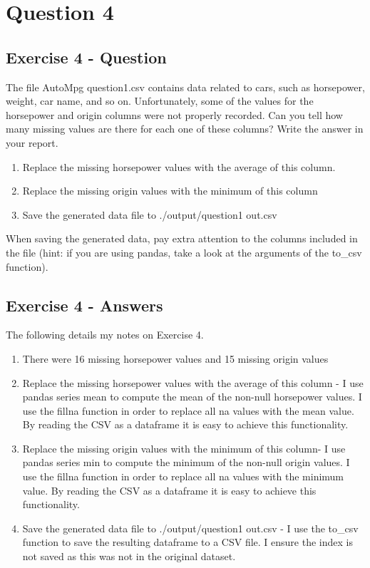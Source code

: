 \documentclass{scrreprt}
\begin{document}
	
\newpage
\chapter{Question 4}
\section{Exercise 4 - Question}
The file AutoMpg question1.csv contains data related to cars, such as horsepower, weight, car name, and so on. Unfortunately, some of the values for the horsepower and origin columns were not properly recorded. Can you tell how many missing values are there for each one of these columns? Write the answer in your report.

\begin{enumerate}
\item Replace the missing horsepower values with the average of this column.
\item Replace the missing origin values with the minimum of this column
\item Save the generated data file to ./output/question1 out.csv
\end{enumerate}

When saving the generated data, pay extra attention to the columns included in the file (hint: if you are using pandas, take a look at the arguments of the to\_csv function).


\section{Exercise 4 - Answers}
The following details my notes on Exercise 4.
	\begin{enumerate}
		
		\item There were 16 missing horsepower values and 15 missing origin values
		\item Replace the missing horsepower values with the average of this column - I use pandas series mean to compute the mean of the non-null horsepower values. I use the fillna function in order to replace all na values with the mean value. By reading the CSV as a dataframe it is easy to achieve this functionality.
		\item Replace the missing origin values with the minimum of this column- I use pandas series min to compute the minimum of the non-null origin values. I use the fillna function in order to replace all na values with the minimum value. By reading the CSV as a dataframe it is easy to achieve this functionality.
		\item Save the generated data file to ./output/question1 out.csv - I use the to\_csv function to save the resulting dataframe to a CSV file. I ensure the index is not saved as this was not in the original dataset.
	\end{enumerate}
	
\end{document}

